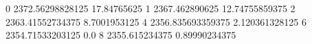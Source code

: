 0 2372.56298828125 17.84765625
1 2367.462890625 12.74755859375
2 2363.41552734375 8.7001953125
4 2356.835693359375 2.120361328125
6 2354.71533203125 0.0
8 2355.615234375 0.89990234375
